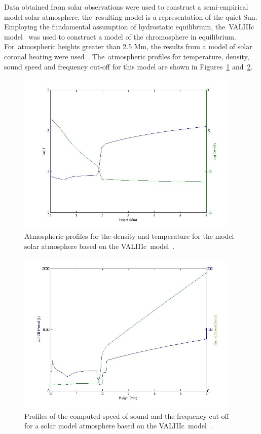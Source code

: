 \documentclass[physics,article,accept,pdftex,moreauthors]{Definitions/mdpi}
\begin{document}
Data obtained from solar observations were used to construct a semi-empirical model solar atmosphere, the~resulting model is a representation of the 
 {quiet} 
Sun. Employing the fundamental assumption of hydrostatic equilibrium, the~VALIIIc model~\cite{Vernazza1981} was used to construct a model of 
the chromosphere in equilibrium. For~atmospheric heights greater than 2.5 Mm, the results from a model of solar coronal heating were used~\cite{McWhirter1975}. The~atmospheric profiles for temperature, density, sound speed and frequency cut-off for this model are shown in Figures~\ref{fig3} and~\ref{fig4}.

\begin{figure}[H]
\includegraphics[width=10.5cm]{VAL3C_rho_temp_fig1L.jpg}
\caption{{Atmospheric} %
 profiles for the density and temperature for the model solar atmosphere based on the 
VALIIIc~model~{\cite{Vernazza1981}.} %
\label{fig3}}
\end{figure}
\unskip

\begin{figure}[H]
\includegraphics[width=10.5cm]{soundspeedVAL3C_profile_fig1R.jpg}
\caption{Profiles of the computed speed of sound and the frequency cut-off for a solar model atmosphere based on the 
VALIIIc~model~{\cite{Vernazza1981}}.
\label{fig4}}
\end{figure}
\end{document}
